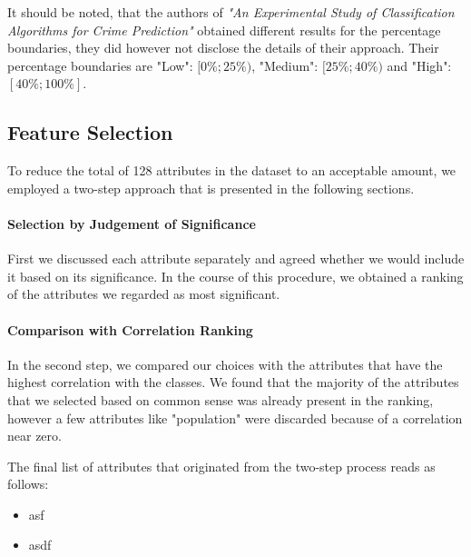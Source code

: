 It should be noted, that the authors of \textit{"An Experimental Study
of Classification Algorithms for Crime Prediction"} \cite{indian}
obtained different results for the percentage boundaries, they did
however not disclose the details of their approach.
Their percentage boundaries are "Low": \([0\%;25\%)\), "Medium": \([25\%; 40\%)\) and "High": \([40\%; 100\%]\).

\subsection{Feature Selection}

To reduce the total of 128 attributes in the dataset to an acceptable
amount, we employed a two-step approach that is presented in the
following sections.

\paragraph{Selection by Judgement of Significance}
First we discussed each attribute separately and agreed whether we
would include it based on its significance. In the course of this
procedure, we obtained a ranking of the attributes we regarded as most
significant.

\paragraph{Comparison with Correlation Ranking}
In the second step, we compared our choices with the attributes that
have the highest correlation with the classes. We found that the
majority of the attributes that we selected based on common sense was
already present in the ranking, however a few attributes like
"population" were discarded because of a correlation near zero.

The final list of attributes that originated from the two-step process
reads as follows:

\begin{itemize}
\item asf
  \item asdf
\end{itemize}
